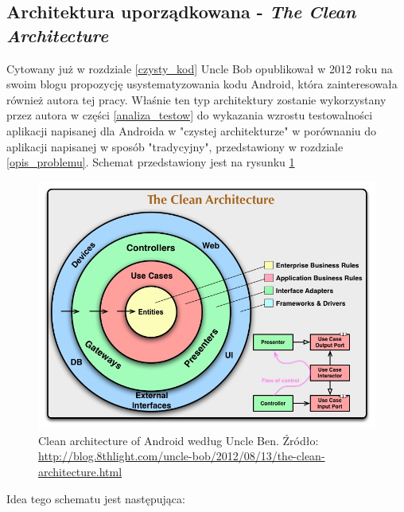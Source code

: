 \subsection{Architektura uporządkowana - \textit{The Clean Architecture}}
Cytowany już w rozdziale \ref{czysty_kod} Uncle Bob opublikował w 2012 roku na swoim blogu propozycję usystematyzowania kodu Android, która zainteresowała również autora tej pracy. Właśnie ten typ architektury zostanie wykorzystany przez autora w części \ref{analiza_testow} do wykazania wzrostu testowalności aplikacji napisanej dla Androida w "czystej architekturze" w porównaniu do aplikacji napisanej w sposób "tradycyjny", przedstawiony w rozdziale \ref{opis_problemu}. Schemat przedstawiony jest na rysunku \ref{fig:clean_architecture}

\begin{figure}[!htb]
    \centering
    \includegraphics[width=13cm]{imgs/ch4_clean_architecture.jpg}
    \caption
{Clean architecture of Android według Uncle Ben. Źródło: \url{http://blog.8thlight.com/uncle-bob/2012/08/13/the-clean-architecture.html}}
    \label{fig:clean_architecture}
\end{figure} 

Idea tego schematu jest następująca:

